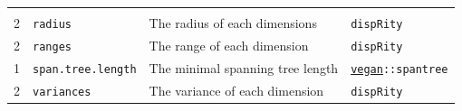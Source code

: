 \documentclass[]{book}
\theoremstyle{definition}
\theoremstyle{definition}
\theoremstyle{definition}
\theoremstyle{remark}
\begin{document}
\begin{longtable}[]{@{}llll@{}}
\begin{minipage}[t]{0.11\columnwidth}
\end{minipage}\tabularnewline
\begin{minipage}[t]{0.08\columnwidth}\raggedright\strut
2\strut
\end{minipage} & \begin{minipage}[t]{0.08\columnwidth}\raggedright\strut
\texttt{radius}\strut
\end{minipage} & \begin{minipage}[t]{0.61\columnwidth}\raggedright\strut
The radius of each dimensions\strut
\end{minipage} & \begin{minipage}[t]{0.11\columnwidth}\raggedright\strut
\texttt{dispRity}\strut
\end{minipage}\tabularnewline
\begin{minipage}[t]{0.08\columnwidth}\raggedright\strut
2\strut
\end{minipage} & \begin{minipage}[t]{0.08\columnwidth}\raggedright\strut
\texttt{ranges}\strut
\end{minipage} & \begin{minipage}[t]{0.61\columnwidth}\raggedright\strut
The range of each dimension\strut
\end{minipage} & \begin{minipage}[t]{0.11\columnwidth}\raggedright\strut
\texttt{dispRity}\strut
\end{minipage}\tabularnewline
\begin{minipage}[t]{0.08\columnwidth}\raggedright\strut
1\strut
\end{minipage} & \begin{minipage}[t]{0.08\columnwidth}\raggedright\strut
\texttt{span.tree.length}\strut
\end{minipage} & \begin{minipage}[t]{0.61\columnwidth}\raggedright\strut
The minimal spanning tree length\strut
\end{minipage} & \begin{minipage}[t]{0.11\columnwidth}\raggedright\strut
\href{https://cran.r-project.org/web/packages/vegan/index.html}{\texttt{vegan}}\texttt{::spantree}\strut
\end{minipage}\tabularnewline
\begin{minipage}[t]{0.08\columnwidth}\raggedright\strut
2\strut
\end{minipage} & \begin{minipage}[t]{0.08\columnwidth}\raggedright\strut
\texttt{variances}\strut
\end{minipage} & \begin{minipage}[t]{0.61\columnwidth}\raggedright\strut
The variance of each dimension\strut
\end{minipage} & \begin{minipage}[t]{0.11\columnwidth}\raggedright\strut
\texttt{dispRity}\strut
\end{minipage}\tabularnewline
\bottomrule
\end{longtable}
\end{document}

